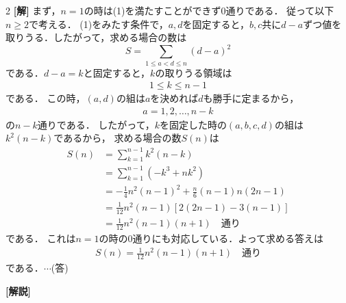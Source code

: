 \documentclass[../../../../main.tex]{subfiles}
\begin{document}
\setcounter{equation}{0}
\begin{oframed}
  
\end{oframed}
\setlength{\columnseprule}{0.4pt}
\begin{multicols}{2}
  {\bf[解]}
  まず，$n=1$の時は(1)を満たすことができず$0$通りである．
  従って以下$n\ge 2$で考える．
  (1)をみたす条件で，$a,d$を固定すると，$b,c$共に$d-a$ずつ値を取りうる．したがって，求める場合の数は
  \[ S = \sum_{1 \le a < d \le n} (d-a)^2 \]
  である．$d-a = k$と固定すると，$k$の取りうる領域は
  \begin{align*}
    1 \le k \le n-1
  \end{align*}
  である．
  この時，$(a,d)$の組は$a$を決めれば$d$も勝手に定まるから，
  \begin{align*}
    a=1,2,\dots,n-k
  \end{align*}
  の$n-k$通りである．
  したがって，$k$を固定した時の$(a,b,c,d)$の組は$k^2(n-k)$であるから，
  求める場合の数$S(n)$は
  \begin{align*}
    S(n)
     & = \sum_{k=1}^{n-1} k^2(n-k)                        \\
     & = \sum_{k=1}^{n-1} (-k^3+nk^2)                     \\
     & = -\frac{1}{4}n^2(n-1)^2 + \frac{n}{6}(n-1)n(2n-1) \\
     & = \frac{1}{12}n^2(n-1)[2(2n-1)-3(n-1)]             \\
     & = \frac{1}{12}n^2(n-1)(n+1) \quad \text{通り}
  \end{align*}
  である．
  これは$n=1$の時の0通りにも対応している．よって求める答えは
  \begin{align*}
    S(n) = \frac{1}{12}n^2(n-1)(n+1) \quad \text{通り}
  \end{align*}
  である．$\cdots$(答)

  \vspace{10pt}
  {\bf[解説]}
  \newpage
\end{multicols}
\end{document}
